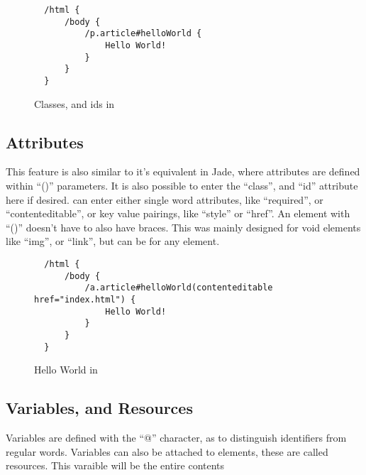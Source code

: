 \begin{figure}[ht!]
  \begin{verbatim}
  /html {
      /body {
          /p.article#helloWorld {
              Hello World!
          }
      }
  }
  \end{verbatim}
  \caption{Classes, and ids in \languageName{}}
\end{figure}


\subsection{Attributes}
This feature is also similar to it's equivalent in Jade, where attributes are defined within ``()'' parameters. It is also possible to enter the ``class'', and ``id'' attribute here if desired. \You{} can enter either single word attributes, like ``required'', or ``contenteditable'', or key value pairings, like ``style'' or ``href''. An element with ``()'' doesn't have to also have braces. This was mainly designed for void elements like ``img'', or ``link'', but can be for any element.

\begin{figure}[ht!]
  \begin{verbatim}
  /html {
      /body {
          /a.article#helloWorld(contenteditable href="index.html") {
              Hello World!
          }
      }
  }
  \end{verbatim}
  \caption{Hello World in \languageName{}}
\end{figure}


\subsection{Variables, and Resources}
Variables are defined with the ``@'' character, as to distinguish identifiers from regular words. Variables can also be attached to elements, these are called resources. This varaible will be the entire contents 